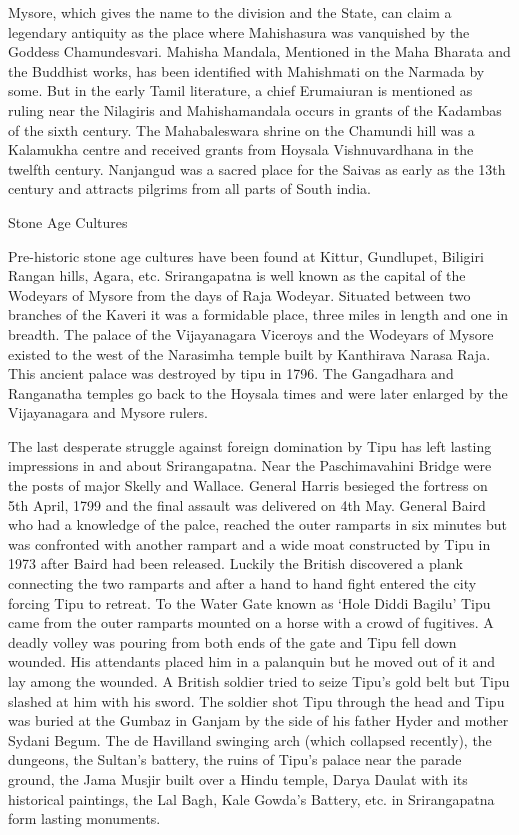 \documentclass{book}
\begin{document}
Mysore, which gives the name to the division and the State, can claim
a legendary antiquity as the place where Mahishasura was vanquished by
the Goddess Chamundesvari. Mahisha Mandala, Mentioned in the Maha
Bharata and the Buddhist works, has been identified with Mahishmati on
the Narmada by some. But in the early Tamil literature, a chief
Erumaiuran is mentioned as ruling near the Nilagiris and
Mahishamandala occurs in grants of the Kadambas of the sixth
century. The Mahabaleswara shrine on the Chamundi hill was a Kalamukha
centre and received grants from Hoysala Vishnuvardhana in the twelfth
century. Nanjangud was a sacred place for the Saivas as early as the
13th century and attracts pilgrims from all parts of South india.

\begin{center}
{\Large Stone Age Cultures}
\end{center}

Pre-historic stone age cultures have been found at Kittur, Gundlupet,
Biligiri Rangan hills, Agara, etc. Srirangapatna is well known as the
capital of the Wodeyars of Mysore from the days of Raja
Wodeyar. Situated between two branches of the Kaveri it was a
formidable place, three miles in length and one in breadth. The palace
of the Vijayanagara Viceroys and the Wodeyars of Mysore existed to the
west of the Narasimha temple built by Kanthirava Narasa Raja. This
ancient palace was destroyed by tipu in 1796. The Gangadhara and
Ranganatha temples go back to the Hoysala times and were later
enlarged by the Vijayanagara and Mysore rulers.

The last desperate struggle against foreign domination by Tipu has
left lasting impressions in and about Srirangapatna. Near the
Paschimavahini Bridge were the posts of major Skelly and
Wallace. General Harris besieged the fortress on 5th April, 1799 and
the final assault was delivered on 4th May. General Baird who had a
knowledge of the palce, reached the outer ramparts in six minutes but
was confronted with another rampart and a wide moat constructed by
Tipu in 1973 after Baird had been released. Luckily the British
discovered a plank connecting the two ramparts and after a hand to
hand fight entered the city forcing Tipu to retreat. To the Water Gate
known as `Hole Diddi Bagilu' Tipu came from the outer ramparts mounted
on a horse with a crowd of fugitives. A deadly volley was pouring from
both ends of the gate and Tipu fell down wounded. His attendants
placed him in a palanquin but he moved out of it and lay among the
wounded. A British soldier tried to seize Tipu's gold belt but Tipu
slashed at him with his sword. The soldier shot Tipu through the head
and Tipu was buried at the Gumbaz in Ganjam by the side of his father
Hyder and mother Sydani Begum. The de Havilland swinging arch (which
collapsed recently), the dungeons, the Sultan's battery, the ruins of
Tipu's palace near the parade ground, the Jama Musjir built over a
Hindu temple, Darya Daulat with its historical paintings, the Lal
Bagh, Kale Gowda's Battery, etc. in Srirangapatna form lasting monuments.
\end{document}

